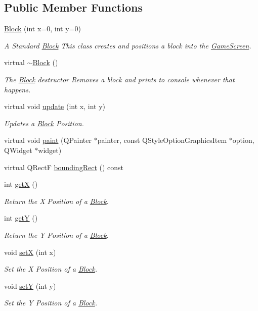 \subsection*{Public Member Functions}
\begin{DoxyCompactItemize}
\item 
\hyperlink{class_block_aada344df339d2124eeaa726367ae27fe}{Block} (int x=0, int y=0)
\begin{DoxyCompactList}\small\item\em A Standard \hyperlink{class_block}{Block} This class creates and positions a block into the \hyperlink{class_game_screen}{Game\-Screen}. \end{DoxyCompactList}\item 
virtual \hyperlink{class_block_a19d1bd0e1cef6a865ed2745a2e648405}{$\sim$\-Block} ()
\begin{DoxyCompactList}\small\item\em The \hyperlink{class_block}{Block} destructor Removes a block and prints to console whenever that happens. \end{DoxyCompactList}\item 
virtual void \hyperlink{class_block_aa374e103c2ba9e060c4689f4da21a9ff}{update} (int x, int y)
\begin{DoxyCompactList}\small\item\em Updates a \hyperlink{class_block}{Block} Position. \end{DoxyCompactList}\item 
virtual void \hyperlink{class_block_a8f526f6d76bf11afae85d8b23239cce2}{paint} (Q\-Painter $\ast$painter, const Q\-Style\-Option\-Graphics\-Item $\ast$option, Q\-Widget $\ast$widget)
\item 
virtual Q\-Rect\-F \hyperlink{class_block_aee4444b92a82f5a8080e9019ef1e554d}{bounding\-Rect} () const 
\item 
int \hyperlink{class_block_a527c8f990b4b99dda6f4ca225ee32c14}{get\-X} ()
\begin{DoxyCompactList}\small\item\em Return the X Position of a \hyperlink{class_block}{Block}. \end{DoxyCompactList}\item 
int \hyperlink{class_block_a2501c303a7975db005ddc49d9551a51b}{get\-Y} ()
\begin{DoxyCompactList}\small\item\em Return the Y Position of a \hyperlink{class_block}{Block}. \end{DoxyCompactList}\item 
void \hyperlink{class_block_ab9ac08d83a0e4ff7acb78029df4cc9e2}{set\-X} (int x)
\begin{DoxyCompactList}\small\item\em Set the X Position of a \hyperlink{class_block}{Block}. \end{DoxyCompactList}\item 
void \hyperlink{class_block_a57c1fcfd7d7cda4b9e21d69a25896c17}{set\-Y} (int y)
\begin{DoxyCompactList}\small\item\em Set the Y Position of a \hyperlink{class_block}{Block}. \end{DoxyCompactList}\end{DoxyCompactItemize}
